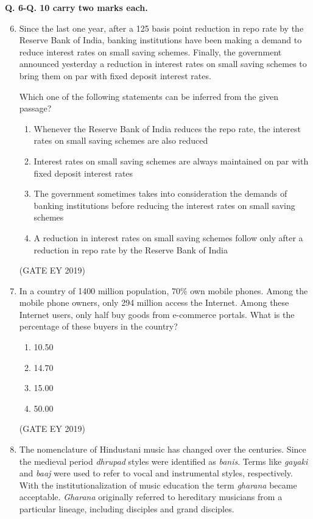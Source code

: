 \documentclass[journal,12pt,onecolumn]{IEEEtran}
\theoremstyle{remark}
\begin{document}
\textbf{Q. 6-Q. 10 carry two marks each.}
\begin{enumerate}
    \setcounter{enumi}{5}
    \item Since the last one year, after a 125 basis point reduction in repo rate by the Reserve Bank of India, banking institutions have been making a demand to reduce interest rates on small saving schemes. Finally, the government announced yesterday a reduction in interest rates on small saving schemes to bring them on par with fixed deposit interest rates.  

    Which one of the following statements can be inferred from the given passage?  
    
    \begin{enumerate}
        \item Whenever the Reserve Bank of India reduces the repo rate, the interest rates on small saving schemes are also reduced
        \item Interest rates on small saving schemes are always maintained on par with fixed deposit interest rates
        \item The government sometimes takes into consideration the demands of banking institutions before reducing the interest rates on small saving schemes
        \item A reduction in interest rates on small saving schemes follow only after a reduction in repo rate by the Reserve Bank of India
    \end{enumerate}
    \hfill{(GATE EY 2019)}

    \item In a country of 1400 million population, 70\% own mobile phones. Among the mobile phone owners, only 294 million access the Internet. Among these Internet users, only half buy goods from e-commerce portals. What is the percentage of these buyers in the country?  
    \begin{multicols}{4}
    \begin{enumerate}
        \item 10.50
        \item 14.70
        \item 15.00
        \item 50.00
    \end{enumerate}
    \end{multicols}
    \hfill{(GATE EY 2019)}
    \item The nomenclature of Hindustani music has changed over the centuries. Since the medieval period \textit{dhrupad} styles were identified as \textit{banis}. Terms like \textit{gayaki} and \textit{baaj} were used to refer to vocal and instrumental styles, respectively. With the institutionalization of music education the term \textit{gharana} became acceptable. \textit{Gharana} originally referred to hereditary musicians from a particular lineage, including disciples and grand disciples.  


\end{enumerate}
\end{document}
